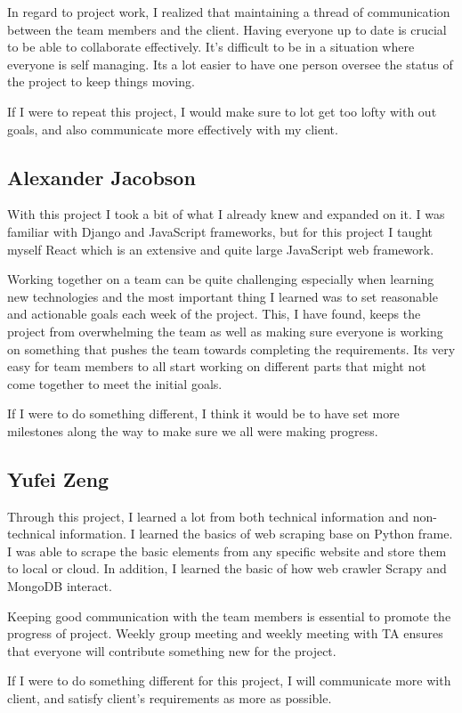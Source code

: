 \documentclass[onecolumn, draftclsnofoot, 10pt, compsoc]{IEEEtran}
\begin{document}
In regard to project work, I realized that maintaining a thread of communication between the team members and the client. Having everyone up to date is crucial to be able to collaborate effectively. It's difficult to be in a situation where everyone is self managing. Its a lot easier to have one person oversee the status of the project to keep things moving. 

If I were to repeat this project, I would make sure to lot get too lofty with out goals, and also communicate more effectively with my client. 
\subsection{Alexander Jacobson}
With this project I took a bit of what I already knew and expanded on it. I was familiar with Django and JavaScript frameworks, but for this project I taught myself React which is an extensive and quite large JavaScript web framework. 

Working together on a team can be quite challenging especially when learning new technologies and the most important thing I learned was to set reasonable and actionable goals each week of the project. This, I have found, keeps the project from overwhelming the team as well as making sure everyone is working on something that pushes the team towards completing the requirements. Its very easy for team members to all start working on different parts that might not come together to meet the initial goals.

If I were to do something different, I think it would be to have set more milestones along the way to make sure we all were making progress.

\subsection{Yufei Zeng}
Through this project, I learned a lot from both technical information and non-technical information. I learned the basics of web scraping base on Python frame. I was able to scrape the basic elements from any specific website and store them to local or cloud. In addition, I learned the basic of how web crawler Scrapy and MongoDB interact. 

Keeping good communication with the team members is essential to promote the progress of project. Weekly group meeting and weekly meeting with TA ensures that everyone will contribute something new for the project.

If I were to do something different for this project, I will communicate more with client, and satisfy client's requirements as more as possible.
\end{document}
